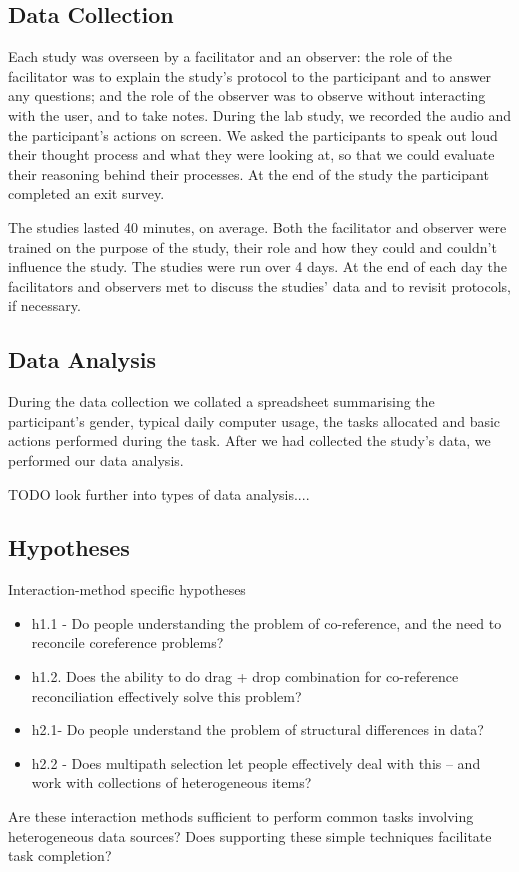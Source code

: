 \documentclass{sigchi}
\begin{document}
\subsection{Data Collection}
Each study was overseen by a facilitator and an observer:  the role of the facilitator was to explain the study's protocol to the participant and to answer any questions; and the role of the observer was to observe without interacting with the user, and to take notes.  During the lab study, we recorded the audio and the participant's actions on screen. We asked the participants to speak out loud their thought process and what they were looking at, so that we could evaluate their reasoning behind their processes.  At the end of the study the participant completed an exit survey.  

The studies lasted 40 minutes, on average.  Both the facilitator and observer were trained on the purpose of the study, their role and how they could and couldn't influence the study.  The studies were run over 4 days.  At the end of each day the facilitators and observers met to discuss the studies' data and to revisit protocols, if necessary.

\subsection{Data Analysis}

During the data collection we collated a spreadsheet summarising the participant's gender, typical daily computer usage, the tasks allocated and basic actions performed during the task.  After we had collected the study's data, we performed our data analysis. 

TODO look further into types of data analysis....

\subsection{Hypotheses}
Interaction-method specific hypotheses
\begin{itemize}
	\item h1.1 - Do people understanding the problem of co-reference, and the need to reconcile coreference problems?
	\item h1.2. Does the ability to do drag + drop combination for co-reference reconciliation effectively solve this problem?
	\item h2.1- Do people understand the problem of structural differences in data?
	\item h2.2 - Does multipath selection let people effectively deal with this -- and work with collections of heterogeneous items?
\end{itemize}
Are these interaction methods sufficient to perform common tasks involving heterogeneous data sources?  Does supporting these simple techniques facilitate task completion?
\end{document}
